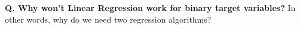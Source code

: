 \begin{frame}[fragile]{\textbf{Q. Why won't Linear Regression work for binary target variables?}}
  In other words, why do we need two regression algorithms?
  \begin{columns}[T]
  \begin{column}{.58\textwidth}
\end{column}
\end{columns}
\end{frame}
